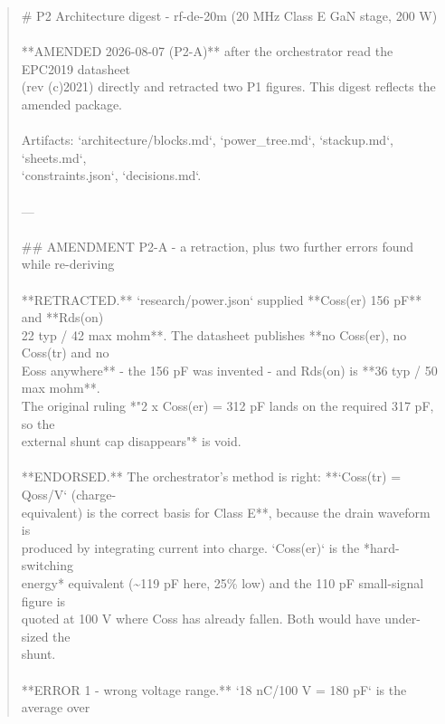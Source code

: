 \documentclass[11pt,a4paper]{article}
\begin{document}
\begin{quote}\small\ttfamily\raggedright
\# P2 Architecture digest - rf-de-20m (20 MHz Class E GaN stage, 200 W)\\
~\\
{*}{*}AMENDED 2026-08-07 (P2-A){*}{*} after the orchestrator read the EPC2019 datasheet\\
(rev (c)2021) directly and retracted two P1 figures. This digest reflects the\\
amended package.\\
~\\
Artifacts: `architecture/blocks.md`, `power\_tree.md`, `stackup.md`, `sheets.md`,\\
`constraints.json`, `decisions.md`.\\
~\\
---\\
~\\
\#\# AMENDMENT P2-A - a retraction, plus two further errors found while re-deriving\\
~\\
{*}{*}RETRACTED.{*}{*} `research/power.json` supplied {*}{*}Coss(er) 156 pF{*}{*} and {*}{*}Rds(on)\\
22 typ / 42 max mohm{*}{*}. The datasheet publishes {*}{*}no Coss(er), no Coss(tr) and no\\
Eoss anywhere{*}{*} - the 156 pF was invented - and Rds(on) is {*}{*}36 typ / 50 max mohm{*}{*}.\\
The original ruling {*}"2 x Coss(er) = 312 pF lands on the required 317 pF, so the\\
external shunt cap disappears"{*} is void.\\
~\\
{*}{*}ENDORSED.{*}{*} The orchestrator's method is right: {*}{*}`Coss(tr) = Qoss/V` (charge-\\
equivalent) is the correct basis for Class E{*}{*}, because the drain waveform is\\
produced by integrating current into charge. `Coss(er)` is the {*}hard-switching\\
energy{*} equivalent (\textasciitilde{}119 pF here, 25\% low) and the 110 pF small-signal figure is\\
quoted at 100 V where Coss has already fallen. Both would have under-sized the\\
shunt.\\
~\\
{*}{*}ERROR 1 - wrong voltage range.{*}{*} `18 nC/100 V = 180 pF` is the average over\\

\end{quote}
\end{document}
